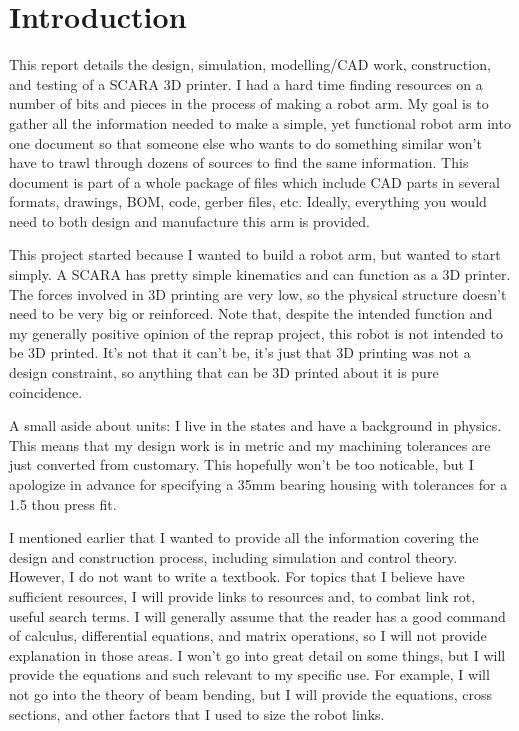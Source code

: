 \documentclass[12pt]{report}
\begin{document}
\maketitle


\chapter{Introduction}

This report details the design, simulation, modelling/CAD work, construction, and testing of a SCARA 3D printer. I had a hard time finding resources on a number of bits and pieces in the process of making a robot arm. My goal is to gather all the information needed to make a simple, yet functional robot arm into one document so that someone else who wants to do something similar won't have to trawl through dozens of sources to find the same information. This document is part of a whole package of files which include CAD parts in several formats, drawings, BOM, code, gerber files, etc. Ideally, everything you would need to both design and manufacture this arm is provided.

This project started because I wanted to build a robot arm, but wanted to start simply. A SCARA has pretty simple kinematics and can function as a 3D printer. The forces involved in 3D printing are very low, so the physical structure doesn't need to be very big or reinforced. Note that, despite the intended function and my generally positive opinion of the reprap project, this robot is not intended to be 3D printed. It's not that it can't be, it's just that 3D printing was not a design constraint, so anything that can be 3D printed about it is pure coincidence.

A small aside about units: I live in the states and have a background in physics. This means that my design work is in metric and my machining tolerances are just converted from customary. This hopefully won't be too noticable, but I apologize in advance for specifying a 35mm bearing housing with tolerances for a 1.5 thou press fit.

I mentioned earlier that I wanted to provide all the information covering the design and construction process, including simulation and control theory. However, I do not want to write a textbook. For topics that I believe have sufficient resources, I will provide links to resources and, to combat link rot, useful search terms. I will generally assume that the reader has a good command of calculus, differential equations, and matrix operations, so I will not provide explanation in those areas. I won't go into great detail on some things, but I will provide the equations and such relevant to my specific use. For example, I will not go into the theory of beam bending, but I will provide the equations, cross sections, and other factors that I used to size the robot links.
\end{document}

